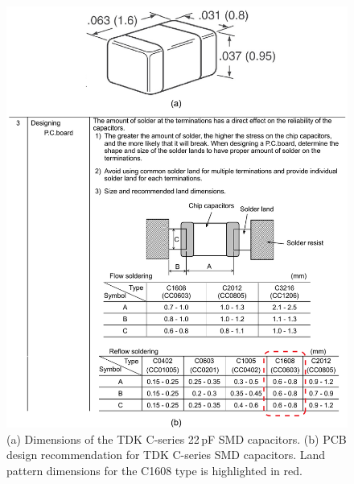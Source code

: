 \documentclass[12pt,letterpaper]{scrartcl}
\begin{document}
	\begin{figure}[ht]
		\centering
		\includegraphics{tdk_cap_datasheet}
		\caption{(a) Dimensions of the TDK C-series 22\,pF SMD capacitors. (b) PCB design recommendation for TDK C-series SMD capacitors. Land pattern dimensions for the C1608 type is highlighted in red.}
		\label{fig:tdk_cap_datasheet}
	\end{figure}
\end{document}

